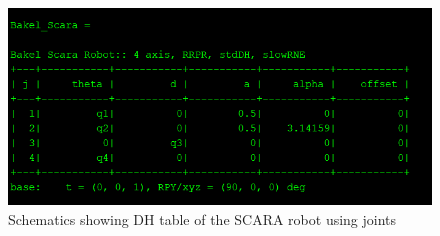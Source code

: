 \documentclass[12pt]{report}
\begin{document}
\begin{figure}[H]
	\centering
	\includegraphics[scale=1.2]{run2} %
	\caption{Schematics showing DH table of the SCARA robot using joints}
	\label{run2} %
\end{figure}
\end{document}
